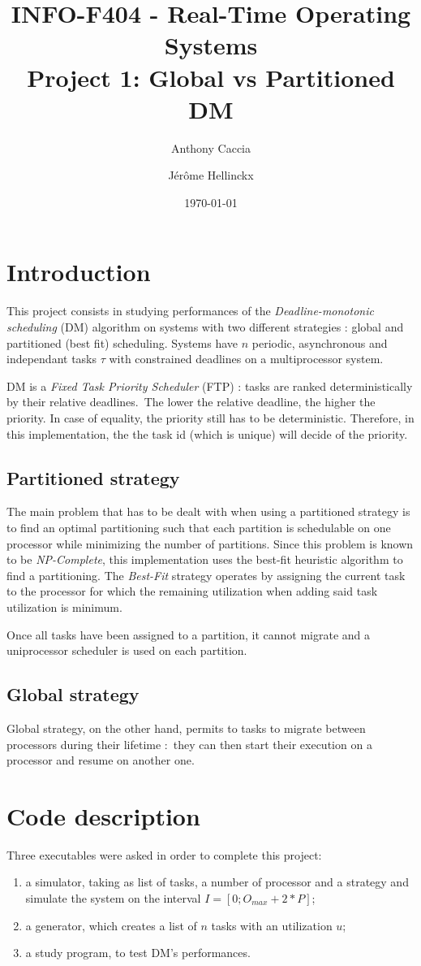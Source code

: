 \documentclass[a4paper]{article}
\title{INFO-F404 - Real-Time Operating Systems\\Project 1: Global vs Partitioned DM}
\author{Anthony Caccia \and J\'{e}r\^{o}me Hellinckx}
\date{\today}
\begin{document}
\renewcommand{\labelitemi}{$\bullet$}
\maketitle

\section{Introduction}
This project consists in studying performances of the \emph{Deadline-monotonic scheduling} (DM) algorithm on systems with two different strategies : global and partitioned (best fit) scheduling. Systems have $n$ periodic, asynchronous and independant tasks $\tau$ with constrained deadlines on a multiprocessor system.

DM is a \emph{Fixed Task Priority Scheduler} (FTP) : tasks are ranked deterministically by their relative deadlines. The lower the relative deadline, the higher the priority. In case of equality, the priority still has to be deterministic. Therefore, in this implementation, the the task id (which is unique) will decide of the priority.

\subsection{Partitioned strategy}
The main problem that has to be dealt with when using a partitioned strategy is to find an optimal partitioning such that each partition is schedulable on one processor while minimizing the number of partitions. Since this problem is known to be \emph{NP-Complete}, this implementation uses the best-fit heuristic algorithm to find a partitioning. The \emph{Best-Fit} strategy operates by assigning the current task to the processor for which the remaining utilization when adding said task utilization is minimum.

Once all tasks have been assigned to a partition, it cannot migrate and a uniprocessor scheduler is used on each partition. 

\subsection{Global strategy}
Global strategy, on the other hand, permits to tasks to migrate between processors during their lifetime : they can then start their execution on a processor and resume on another one.

\section{Code description}
Three executables were asked in order to complete this project:
\begin{enumerate}
  \item a simulator, taking as list of tasks, a number of processor and a strategy and simulate the system on the interval $I = [0; O_{max} + 2 * P]$;
  \item a generator, which creates a list of $n$ tasks with an utilization $u$;
  \item a study program, to test DM's performances.
\end{enumerate}
\end{document}
